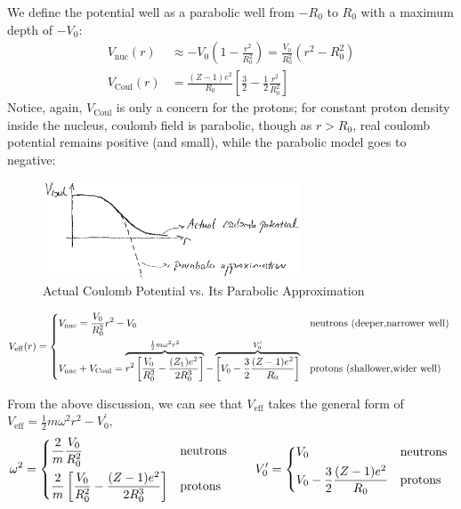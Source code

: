 \documentclass{school-22.101-notes}
\begin{document}
We define the potential well as a parabolic well from $-R_0$ to $R_0$ with a maximum depth of $-V_0$: 
\begin{align}
V_{\mathrm{nuc}} (r) &\approx - V_0 \left( 1 - \frac{r^2}{R_0^2} \right) = \frac{V_0}{R_0^2} (r^2 - R_0^2)  \\
V_{\mathrm{Coul}} (r) &= \frac{(Z-1) e^2}{R_0} \left[ \frac{3}{2} - \frac{1}{2}  \frac{r^2}{R_0^2}\right] 
\end{align}
Notice, again, $V_{\mathrm{Coul}}$ is only a concern for the protons; for constant proton density inside the nucleus, coulomb field is parabolic, though as $r > R_0$, real coulomb potential remains positive (and small), while the parabolic model goes to negative: 

\begin{figure}[h!]
    \centering
    \includegraphics[width=3in]{images/shell/Vcoul-parabolic-model.png}
    \caption{Actual Coulomb Potential vs. Its Parabolic Approximation}
\end{figure}

\begin{align}
V_{\mathrm{eff}} (r) = 
\begin{dcases*}
V_{\mathrm{nuc}}  = \frac{V_0}{R_0^2} r^2 - V_0 
& neutrons (deeper,narrower well) \\
V_{\mathrm{nuc}} + V_{\mathrm{Coul}} = \overbrace{ r^2 \left[ \frac{V_0}{R_0^2} - \frac{(Z_1)e^2}{2 R_0^3} \right] }^{\frac{1}{2} m \omega^2 r^2} - \overbrace{ \left[  V_0 - \frac{3}{2} \frac{(Z-1) e^2}{R_0} \right] }^{V_0^{\prime} }   & protons (shallower,wider well) 
\end{dcases*}
\end{align}

From the above discussion, we can see that $V_{\mathrm{eff}}$ takes the general form of $\boxed{V_{\mathrm{eff}} = \frac{1}{2} m \omega^2 r^2 - V_0^{\prime}},$ 
\begin{align}
\omega^2 =
\begin{dcases*}
\frac{2}{m} \frac{V_0}{R_0^2}  & neutrons \\
\frac{2}{m} \left[ \frac{V_0}{R_0^2} - \frac{(Z-1) e^2}{2 R_0^3} \right] & protons \\
\end{dcases*}
\fsp \fsp \fsp \fsp \fsp
V_0^{\prime} = 
\begin{dcases*}
V_0 & neutrons \\
V_0 - \frac{3}{2} \frac{(Z-1) e^2}{R_0} & protons \\
\end{dcases*}
\end{align}
\end{document}
